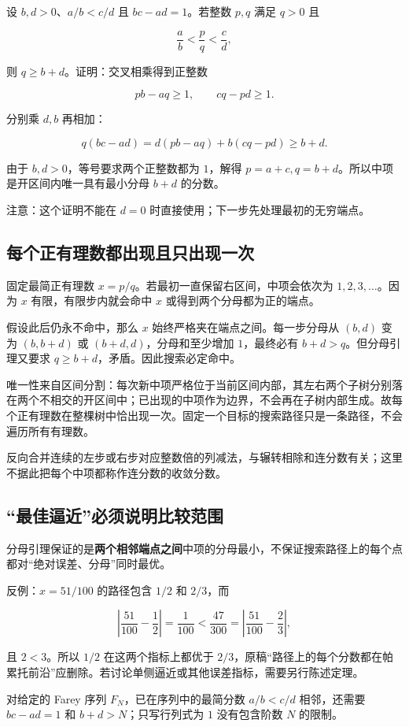 设 $b,d>0$、$a/b<c/d$ 且 $bc-ad=1$。若整数 $p,q$ 满足 $q>0$ 且

\[
\frac ab<\frac pq<\frac cd,
\]

则 $q\ge b+d$。证明：交叉相乘得到正整数

\[
pb-aq\ge1,\qquad cq-pd\ge1.
\]

分别乘 $d,b$ 再相加：

\[
q(bc-ad)=d(pb-aq)+b(cq-pd)\ge b+d.
\]

由于 $b,d>0$，等号要求两个正整数都为 $1$，解得 $p=a+c,q=b+d$。所以中项是开区间内唯一具有最小分母 $b+d$ 的分数。

注意：这个证明不能在 $d=0$ 时直接使用；下一步先处理最初的无穷端点。

\subsection{每个正有理数都出现且只出现一次}


固定最简正有理数 $x=p/q$。若最初一直保留右区间，中项会依次为 $1,2,3,\ldots$。因为 $x$ 有限，有限步内就会命中 $x$ 或得到两个分母都为正的端点。

假设此后仍永不命中，那么 $x$ 始终严格夹在端点之间。每一步分母从 $(b,d)$ 变为 $(b,b+d)$ 或 $(b+d,d)$，分母和至少增加 $1$，最终必有 $b+d>q$。但分母引理又要求 $q\ge b+d$，矛盾。因此搜索必定命中。

唯一性来自区间分割：每次新中项严格位于当前区间内部，其左右两个子树分别落在两个不相交的开区间中；已出现的中项作为边界，不会再在子树内部生成。故每个正有理数在整棵树中恰出现一次。固定一个目标的搜索路径只是一条路径，不会遍历所有有理数。

反向合并连续的左步或右步对应整数倍的列减法，与辗转相除和连分数有关；这里不据此把每个中项都称作连分数的收敛分数。

\subsection{“最佳逼近”必须说明比较范围}


分母引理保证的是\textbf{两个相邻端点之间}中项的分母最小，不保证搜索路径上的每个点都对“绝对误差、分母”同时最优。

反例：$x=51/100$ 的路径包含 $1/2$ 和 $2/3$，而

\[
\left|\frac{51}{100}-\frac12\right|=\frac1{100}
<\frac{47}{300}=\left|\frac{51}{100}-\frac23\right|,
\]

且 $2<3$。所以 $1/2$ 在这两个指标上都优于 $2/3$，原稿“路径上的每个分数都在帕累托前沿”应删除。若讨论单侧逼近或其他误差指标，需要另行陈述定理。

对给定的 Farey 序列 $F_N$，已在序列中的最简分数 $a/b<c/d$ 相邻，还需要 $bc-ad=1$ 和 $b+d>N$；只写行列式为 $1$ 没有包含阶数 $N$ 的限制。
